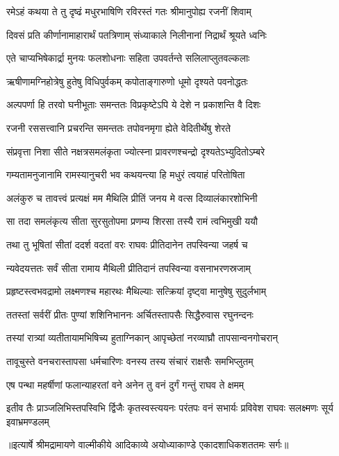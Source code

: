 \twolineshloka
{रमेऽहं कथया ते तु दृष्ढं मधुरभाषिणि}
{रविरस्तं गतः श्रीमानुपोह्य रजनीं शिवाम्} %

\twolineshloka
{दिवसं प्रति कीर्णानामाहारार्थं पतत्रिणाम्}
{संध्याकाले निलीनानां निद्रार्थं श्रूयते ध्वनिः} %

\twolineshloka
{एते चाप्यभिषेकार्द्रा मुनयः फलशोधनाः}
{सहिता उपवर्तन्ते सलिलाप्लुतवल्कलाः} %

\twolineshloka
{ऋषीणामग्निहोत्रेषु हुतेषु विधिपुर्वकम्}
{कपोताङ्गारुणो धूमो दृश्यते पवनोद्धतः} %

\twolineshloka
{अल्पपर्णा हि तरवो घनीभूताः समन्ततः}
{विप्रकृष्टेऽपि ये देशे न प्रकाशन्ति वै दिशः} %

\twolineshloka
{रजनी रससत्त्वानि प्रचरन्ति समन्ततः}
{तपोवनमृगा ह्येते वेदितीर्थेषु शेरते} %

\twolineshloka
{संप्रवृत्ता निशा सीते नक्षत्रसमलंकृता}
{ज्योत्स्ना प्रावरणश्चन्द्रो दृश्यतेऽभ्युदितोऽम्बरे} %

\twolineshloka
{गम्यतामनुजानामि रामस्यानुचरी भव}
{कथयन्त्या हि मधुरं त्वयाहं परितोषिता} %

\twolineshloka
{अलंकुरु च तावत्त्वं प्रत्यक्षं मम मैथिलि}
{प्रीतिं जनय मे वत्स दिव्यालंकारशोभिनी} %

\twolineshloka
{सा तदा समलंकृत्य सीता सुरसुतोपमा}
{प्रणम्य शिरसा तस्यै रामं त्वभिमुखी ययौ} %

\twolineshloka
{तथा तु भूषितां सीतां ददर्श वदतां वरः}
{राघवः प्रीतिदानेन तपस्विन्या जहर्ष च} %

\twolineshloka
{न्यवेदयत्ततः सर्वं सीता रामाय मैथिली}
{प्रीतिदानं तपस्विन्या वसनाभरणस्रजाम्} %

\twolineshloka
{प्रहृष्टस्त्वभवद्रामो लक्ष्मणश्च महारथः}
{मैथिल्याः सत्क्रियां दृष्ट्वा मानुषेषु सुदुर्लभाम्} %

\twolineshloka
{ततस्तां सर्वरीं प्रीतः पुण्यां शशिनिभाननः}
{अर्चितस्तापसैः सिद्धैरुवास रघुनन्दनः} %

\twolineshloka
{तस्यां रात्र्यां व्यतीतायामभिषिच्य हुताग्निकान्}
{आपृच्छेतां नरव्याघ्रौ तापसान्वनगोचरान्} %

\twolineshloka
{तावूचुस्ते वनचरास्तापसा धर्मचारिणः}
{वनस्य तस्य संचारं राक्षसैः समभिप्लुतम्} %

\twolineshloka
{एष पन्था महर्षीणां फलान्याहरतां वने}
{अनेन तु वनं दुर्गं गन्तुं राघव ते क्षमम्} %

\fourlineindentedshloka
{इतीव तैः प्राञ्जलिभिस्तपस्विभि}
{र्द्विजैः कृतस्वस्त्ययनः परंतपः}
{वनं सभार्यः प्रविवेश राघवः}
{ सलक्ष्मणः सूर्य इवाभ्रमण्डलम्} %


{॥इत्यार्षे श्रीमद्रामायणे वाल्मीकीये आदिकाव्ये अयोध्याकाण्डे एकादशाधिकशततमः सर्गः॥}

